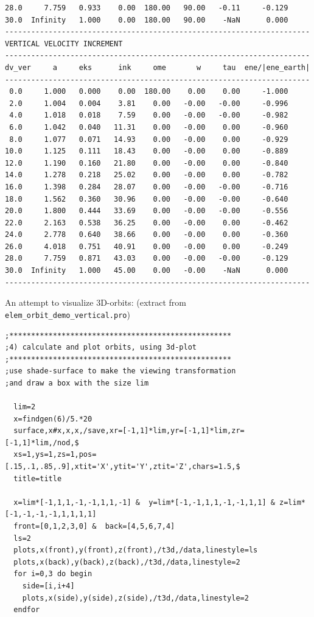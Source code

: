 \documentclass[a4paper,12pt]{article}
\def\red{\color{red}}
\def\black{\color{RGBblack}}
\begin{document}
{{{{\begin{verbatim}
28.0     7.759   0.933    0.00  180.00   90.00   -0.11     -0.129
30.0  Infinity   1.000    0.00  180.00   90.00    -NaN      0.000
----------------------------------------------------------------------
VERTICAL VELOCITY INCREMENT
----------------------------------------------------------------------
dv_ver     a     eks      ink     ome       w     tau  ene/|ene_earth|
----------------------------------------------------------------------
 0.0     1.000   0.000    0.00  180.00    0.00    0.00     -1.000
 2.0     1.004   0.004    3.81    0.00   -0.00   -0.00     -0.996
 4.0     1.018   0.018    7.59    0.00   -0.00   -0.00     -0.982
 6.0     1.042   0.040   11.31    0.00   -0.00    0.00     -0.960
 8.0     1.077   0.071   14.93    0.00   -0.00    0.00     -0.929
10.0     1.125   0.111   18.43    0.00   -0.00    0.00     -0.889
12.0     1.190   0.160   21.80    0.00   -0.00    0.00     -0.840
14.0     1.278   0.218   25.02    0.00   -0.00    0.00     -0.782
16.0     1.398   0.284   28.07    0.00   -0.00   -0.00     -0.716
18.0     1.562   0.360   30.96    0.00   -0.00   -0.00     -0.640
20.0     1.800   0.444   33.69    0.00   -0.00   -0.00     -0.556
22.0     2.163   0.538   36.25    0.00   -0.00    0.00     -0.462
24.0     2.778   0.640   38.66    0.00   -0.00    0.00     -0.360
26.0     4.018   0.751   40.91    0.00   -0.00    0.00     -0.249
28.0     7.759   0.871   43.03    0.00   -0.00   -0.00     -0.129
30.0  Infinity   1.000   45.00    0.00   -0.00    -NaN      0.000
----------------------------------------------------------------------
\end{verbatim}
\black}

\newpage
\black

An attempt to visualize 3D-orbits: (extract from {\tt elem\_orbit\_demo\_vertical.pro})
{\red \scriptsize 
\begin{verbatim}
;***************************************************
;4) calculate and plot orbits, using 3d-plot
;***************************************************
;use shade-surface to make the viewing transformation 
;and draw a box with the size lim
  
  lim=2
  x=findgen(6)/5.*20
  surface,x#x,x,x,/save,xr=[-1,1]*lim,yr=[-1,1]*lim,zr=[-1,1]*lim,/nod,$
  xs=1,ys=1,zs=1,pos=[.15,.1,.85,.9],xtit='X',ytit='Y',ztit='Z',chars=1.5,$
  title=title

  x=lim*[-1,1,1,-1,-1,1,1,-1] &  y=lim*[-1,-1,1,1,-1,-1,1,1] & z=lim*[-1,-1,-1,-1,1,1,1,1]
  front=[0,1,2,3,0] &  back=[4,5,6,7,4]
  ls=2
  plots,x(front),y(front),z(front),/t3d,/data,linestyle=ls
  plots,x(back),y(back),z(back),/t3d,/data,linestyle=2
  for i=0,3 do begin
    side=[i,i+4]
    plots,x(side),y(side),z(side),/t3d,/data,linestyle=2
  endfor


\end{verbatim}}}}}
\end{document}
